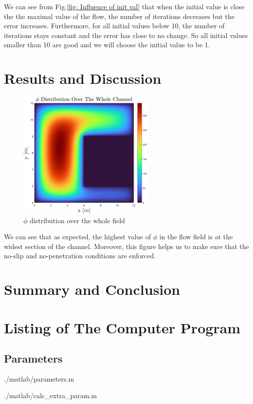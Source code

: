 \documentclass[11pt, a4paper]{article}
\begin{document}
We can see from Fig.\ref{fig: Influence of init val} that when the initial value is close the the maximal value of the flow, the number of iterations decreases but the error increases. Furthermore, for all initial values below 10, the number of iterations stays constant and the error has close to no change. So all initial values smaller than 10 are good and we will choose the initial value to be 1.

\section{Results and Discussion}
\label{sec: results and discussion}
\begin{figure}[H]
    \centering
    \includegraphics[width=0.6\textwidth]{images/phi ditribution.png}
    \caption{$\phi$ distribution over the whole field}
    \label{fig: phi distribution}
\end{figure}
We can see that as expected, the highest value of $\phi$ in the flow field is at the widest section of the channel. Moreover, this figure helps us to make sure that the no-slip and no-penetration conditions are enforced.

\section{Summary and Conclusion}

\newpage
\appendix
\section{Listing of The Computer Program}
\subsection{Parameters}
\begin{lstinputlisting}[captionpos=b,stringstyle=\color{magenta},frame=single, numbers=left, style=MatLab-editor, basicstyle=\mlttfamily\small, caption={Parameters file},mlshowsectionrules=true]{./matlab/parameters.m}
\end{lstinputlisting}
\begin{lstinputlisting}[captionpos=b,stringstyle=\color{magenta},frame=single, numbers=left, style=MatLab-editor, basicstyle=\mlttfamily\small, caption={Extra parameters file},mlshowsectionrules=true]{./matlab/calc_extra_param.m}
\end{lstinputlisting}
\end{document}
